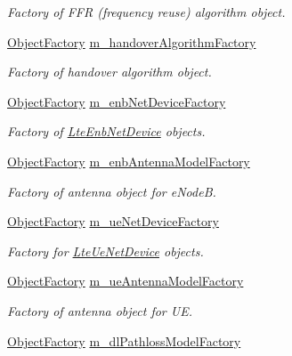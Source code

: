 \begin{DoxyCompactItemize}
\begin{DoxyCompactList}\small\item\em Factory of F\+FR (frequency reuse) algorithm object. \end{DoxyCompactList}\item 
\hyperlink{classns3_1_1ObjectFactory}{Object\+Factory} \hyperlink{classns3_1_1LteHelper_a32db920fb44f4b65250e3cc23eeadd77}{m\+\_\+handover\+Algorithm\+Factory}
\begin{DoxyCompactList}\small\item\em Factory of handover algorithm object. \end{DoxyCompactList}\item 
\hyperlink{classns3_1_1ObjectFactory}{Object\+Factory} \hyperlink{classns3_1_1LteHelper_a9c0c99089bff0702be00c782cb1f0aa6}{m\+\_\+enb\+Net\+Device\+Factory}
\begin{DoxyCompactList}\small\item\em Factory of \hyperlink{classns3_1_1LteEnbNetDevice}{Lte\+Enb\+Net\+Device} objects. \end{DoxyCompactList}\item 
\hyperlink{classns3_1_1ObjectFactory}{Object\+Factory} \hyperlink{classns3_1_1LteHelper_af5ae4f0a3c7ea76ee9cdb2a13a7b296c}{m\+\_\+enb\+Antenna\+Model\+Factory}
\begin{DoxyCompactList}\small\item\em Factory of antenna object for e\+NodeB. \end{DoxyCompactList}\item 
\hyperlink{classns3_1_1ObjectFactory}{Object\+Factory} \hyperlink{classns3_1_1LteHelper_acf4f709448cbc362c35b965782d00464}{m\+\_\+ue\+Net\+Device\+Factory}
\begin{DoxyCompactList}\small\item\em Factory for \hyperlink{classns3_1_1LteUeNetDevice}{Lte\+Ue\+Net\+Device} objects. \end{DoxyCompactList}\item 
\hyperlink{classns3_1_1ObjectFactory}{Object\+Factory} \hyperlink{classns3_1_1LteHelper_ad53289a5a6b37a2621bcd90562ab7ee4}{m\+\_\+ue\+Antenna\+Model\+Factory}
\begin{DoxyCompactList}\small\item\em Factory of antenna object for UE. \end{DoxyCompactList}\item 
\hyperlink{classns3_1_1ObjectFactory}{Object\+Factory} \hyperlink{classns3_1_1LteHelper_a1e60fb862e68676d8aabb29e2ea2dfd9}{m\+\_\+dl\+Pathloss\+Model\+Factory}

\end{DoxyCompactItemize}
